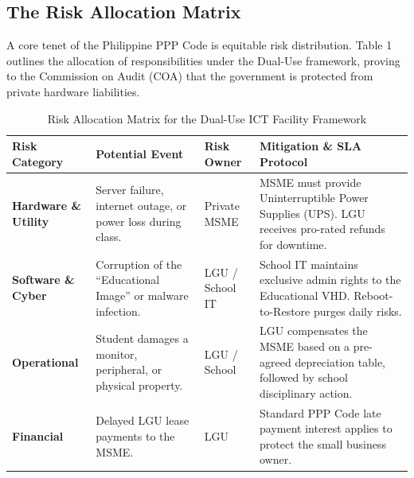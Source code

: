 \subsection{The Risk Allocation Matrix}
A core tenet of the Philippine PPP Code is equitable risk distribution. Table 1 outlines the allocation of responsibilities under the Dual-Use framework, proving to the Commission on Audit (COA) that the government is protected from private hardware liabilities.

\begin{table}[htbp]
\centering
\caption{Risk Allocation Matrix for the Dual-Use ICT Facility Framework}
\vspace{0.5em}
\begin{tabularx}{\textwidth}{|>{\raggedright\arraybackslash}p{2.5cm}|>{\raggedright\arraybackslash}p{4.5cm}|>{\raggedright\arraybackslash}p{2cm}|X|}
\hline
\textbf{Risk Category} & \textbf{Potential Event} & \textbf{Risk Owner} & \textbf{Mitigation \& SLA Protocol} \\
\hline
\textbf{Hardware \& Utility} & Server failure, internet outage, or power loss during class. & Private MSME & MSME must provide Uninterruptible Power Supplies (UPS). LGU receives pro-rated refunds for downtime. \\
\hline
\textbf{Software \& Cyber} & Corruption of the ``Educational Image'' or malware infection. & LGU / School IT & School IT maintains exclusive admin rights to the Educational VHD. Reboot-to-Restore purges daily risks. \\
\hline
\textbf{Operational} & Student damages a monitor, peripheral, or physical property. & LGU / School & LGU compensates the MSME based on a pre-agreed depreciation table, followed by school disciplinary action. \\
\hline
\textbf{Financial} & Delayed LGU lease payments to the MSME. & LGU & Standard PPP Code late payment interest applies to protect the small business owner. \\
\hline
\end{tabularx}
\end{table}